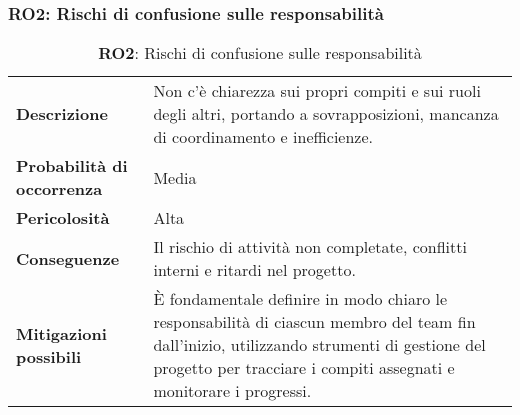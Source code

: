\subsubsection{RO2: Rischi di confusione sulle responsabilità}
\label{sec:Rischi di confusione sulle responsabilità}
\begin{table}[h!]
    \centering
    \renewcommand{\arraystretch}{1.5} %
    \begin{tabularx}{\textwidth}{|X|X|}\hline
    \rowcolor[HTML]{FFD700} 
    \multicolumn{2}{|c|}{\textbf{Rischi di confusione sulle responsabilità}} \\ \hline
    \textbf{Descrizione} & Non c'è chiarezza sui propri compiti e sui ruoli degli altri, portando a sovrapposizioni, 
    mancanza di coordinamento e inefficienze. \\ \hline
    \textbf{Probabilità di occorrenza} & Media \\ \hline
    \textbf{Pericolosità} & Alta\\ \hline
    \textbf{Conseguenze} & Il rischio di attività non completate, conflitti interni e ritardi nel progetto. \\ \hline
    \textbf{Mitigazioni possibili} & È fondamentale definire in modo chiaro le responsabilità di ciascun membro del team fin dall'inizio, 
    utilizzando strumenti di gestione del progetto per tracciare i compiti assegnati e monitorare i progressi.  \\ \hline
    \end{tabularx}
    \caption{\textbf{RO2}: Rischi di confusione sulle responsabilità}
    \end{table}

\newpage

